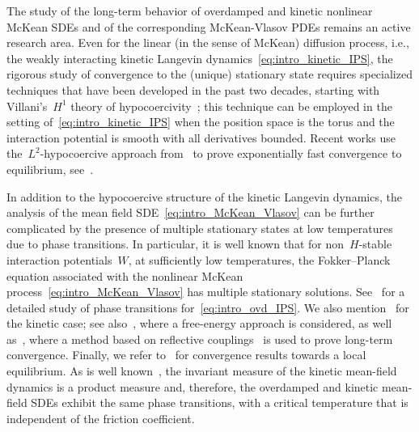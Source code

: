 \documentclass[onefignum,onetabnum]{siamart251216} %
\theoremstyle{plain}
\numberwithin{equation}{section}
\numberwithin{theorem}{section}
\newcounter{ucounter}
\newcommand{\uv}[1]{
  \stepcounter{ucounter}
  \textcolor{orange}{
      \\[.2cm]
    U, comment \arabic{ucounter}. #1
    \\[.2cm]
  }
}
\renewcommand{\uv}[1]{\textcolor{orange}{#1}}
\begin{document}
The study of the long-term behavior of overdamped and kinetic nonlinear McKean SDEs and of the corresponding McKean-Vlasov PDEs remains an active research area. Even for the linear (in the sense of McKean) diffusion process, i.e., the weakly interacting kinetic Langevin dynamics~\eqref{eq:intro_kinetic_IPS}, the rigorous study of convergence to the (unique) stationary state requires specialized techniques that have been developed in the past two decades, starting with Villani's~$H^1$ theory of hypocoercivity~\cite{villani2009hypocoercivity}; this technique can be employed in the setting of~\eqref{eq:intro_kinetic_IPS} when the position space is the torus and the interaction potential is smooth with all derivatives bounded.
Recent works use the~$L^2$-hypocoercive approach from~\cite{dolbeault2009hypocoercivity,dolbeault2015hypocoercivity} to prove exponentially fast convergence to equilibrium, see~\cite{addala20212,gervais2024well}.

In addition to the hypocoercive structure of the kinetic Langevin dynamics, the analysis of the mean field SDE~\eqref{eq:intro_McKean_Vlasov} can be further complicated by the presence of multiple stationary states at low temperatures due to phase transitions. In particular, it is well known that for non~$H$-stable interaction potentials~$W$, at sufficiently low temperatures, the Fokker--Planck equation associated with the nonlinear McKean process~\eqref{eq:intro_McKean_Vlasov} has multiple stationary solutions.
See~\cite{carrillo2020long,delgadino2021diffusive,delgadino2023phase} for a detailed study of phase transitions for~\eqref{eq:intro_ovd_IPS}. We also mention~\cite{duong2016stationary,duong2018mean} for the kinetic case; see also~\cite{duong2017vlasovfokkerplanckequi},
where a free-energy approach is considered, as well as~\cite{guillin2022convergence}, where a method based on reflective couplings~\cite{eberle2016reflection,eberle2019couplings} is used to prove long-term convergence. Finally, we refer to~\cite{monmarche2024local} for convergence results towards a local equilibrium. As is well known~\cite{dressler1987stationary, dressler1990steady}, the invariant measure of the kinetic mean-field dynamics is a product measure and, therefore, the overdamped and kinetic mean-field SDEs exhibit the same phase transitions, with a critical temperature that is independent of the friction coefficient. %
\end{document}
